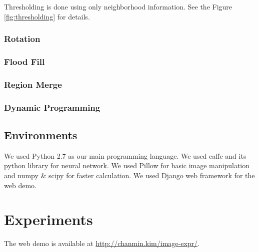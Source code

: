 \documentclass[10pt,twocolumn,letterpaper]{article}
\begin{document}
Thresholding is done using only neighborhood information. See the Figure \ref{fig:thresholding} for details.


\subsubsection{Rotation}

\subsubsection{Flood Fill}

\subsubsection{Region Merge}

\subsubsection{Dynamic Programming}

\subsection{Environments}

We used Python 2.7 as our main programming language.
We used caffe and its python library for neural network.
We used Pillow for basic image manipulation and numpy \& scipy for faster calculation.
We used Django web framework for the web demo.

\section{Experiments}
%
%
%
%
%


The web demo is available at \url{http://chanmin.kim/image-expr/}.
\end{document}
